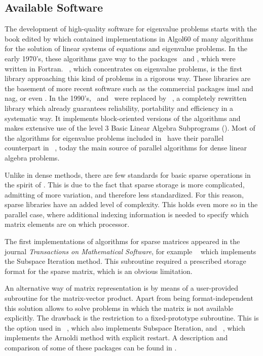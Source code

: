 \subsection{Available Software}

	The development of high-quality software for eigenvalue problems starts with the book edited by \cite{Wilkinson:1971:LA} which contained implementations in Algol60 of many algorithms for the solution of linear systems of equations and eigenvalue problems. In the early 1970's, these algorithms gave way to the packages \linpack\ and \eispack, which were written in Fortran. \eispack\ \citep{Smith:1970:MER}, which concentrates on eigenvalue problems, is the first library approaching this kind of problems in a rigorous way. These libraries are the basement of more recent software such as the commercial packages {\sc imsl} and {\sc nag}, or even \matlab. In the 1990's, \linpack\ and \eispack\ were replaced by \lapack\ \citep{Anderson:1992:LUG}, a completely rewritten library which already guarantees reliability, portability and efficiency in a systematic way. It implements block-oriented versions of the algorithms and makes extensive use of the level 3 Basic Linear Algebra Subprograms (\blas). Most of the algorithms for eigenvalue problems included in \lapack\ have their parallel counterpart in \scalapack\ \citep{Blackford:1997:SUG}, today the main source of parallel algorithms for dense linear algebra problems.
	
	Unlike in dense methods, there are few standards for basic sparse operations in the spirit of \blas. This is due to the fact that sparse storage is more complicated, admitting of more variation, and therefore less standardized. For this reason, sparse libraries have an added level of complexity. This holds even more so in the parallel case, where additional indexing information is needed to specify which matrix elements are on which processor.
	
	The first implementations of algorithms for sparse matrices appeared in the journal {\em Transactions on Mathematical Software\/}, for example \lopsi\ \citep{Stewart:1981:ALS} which implements the Subspace Iteration method. This subroutine required a prescribed storage format for the sparse matrix, which is an obvious limitation. 
	
	An alternative way of matrix representation is by means of a user-provided subroutine for the matrix-vector product. Apart from being format-independent this solution allows to solve problems in which the matrix is not available explicitly. The drawback is the restriction to a fixed-prototype subroutine. This is the option used in \srrit\ \citep{Bai:1997:ASF}, which also implements Subspace Iteration, and \arncheb\ \citep{Braconnier:1993:AAS}, which implements the Arnoldi method with explicit restart. A description and comparison of some of these packages can be found in \citep{Lehoucq:1996:ESC}.
	
